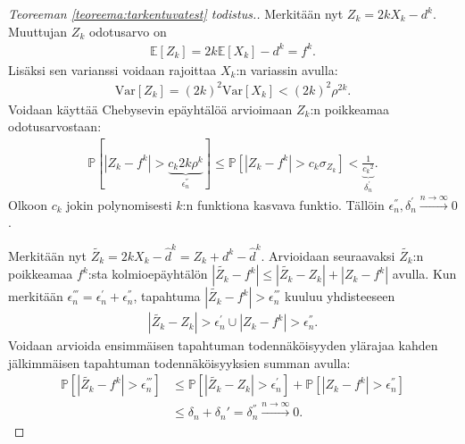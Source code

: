 \documentclass[finnish,12pt,a4paper,pdftex,sci,utf8]{aaltothesis}
\begin{document}
\begin{proof}[Teoreeman \ref{teoreema:tarkentuvatest} todistus.]
	Merkitään nyt $Z_k = 2k X_k - d^k$. Muuttujan $Z_k$ odotusarvo on 
	\begin{align*}
		\mathbb{E}[Z_k] = 2k \mathbb{E}[X_k] - d^k = f^k.
	\end{align*}
	Lisäksi sen varianssi voidaan rajoittaa $X_k$:n variassin avulla: 
	\begin{align*}
		\text{Var}[Z_k] = (2k)^2\text{Var}[X_k] < (2k)^2 \rho^{2k}.
	\end{align*}
	Voidaan käyttää Chebysevin epäyhtälöä arvioimaan $Z_k$:n poikkeamaa odotusarvostaan:
	\begin{align*}
		\mathbb{P}[|Z_k - f^k| > \underbrace{c_k 2k \rho^k}_{\epsilon_{n}^{''}}] \leq \mathbb{P}[|Z_k - f^k| > c_k \sigma_{Z_k}] < \underbrace{\frac{1}{{c_k}^2}}_{\delta_n^{'}}.
	\end{align*}
	Olkoon $c_k$ jokin polynomisesti $k$:n funktiona kasvava funktio. Tällöin $\epsilon_{n}^{''}, \delta_n^{'} \xrightarrow{ n \rightarrow \infty} 0$.

	Merkitään nyt $\tilde{Z_k} = 2kX_k - \hat{d}^k = Z_k + d^k - \hat{d}^k$. Arvioidaan seuraavaksi $\tilde{Z_k}$:n poikkeamaa $f^k$:sta kolmioepäyhtälön $|\tilde{Z_k} - f^k| \leq |\tilde{Z_k} - Z_k| + |Z_k - f^k|$ avulla. Kun merkitään $\epsilon_{n}^{'''} = \epsilon_{n}^{'} + \epsilon_{n}^{''}$, tapahtuma $|\tilde{Z_k} - f^k| > \epsilon_{n}^{'''}$ kuuluu yhdisteeseen 
	\begin{align*}
		|\tilde{Z_k} - Z_k| > \epsilon_{n}^{'} \cup |Z_k - f^k| > \epsilon_{n}^{''}.
	\end{align*}
	Voidaan arvioida ensimmäisen tapahtuman todennäköisyyden ylärajaa kahden jälkimmäisen tapahtuman todennäköisyyksien summan avulla:
	\begin{align*}
		\mathbb{P}[|\tilde{Z_k} - f^k| > \epsilon_{n}^{'''}] &\leq \mathbb{P}[|\tilde{Z_k} - Z_k| > \epsilon_{n}^{'}] + \mathbb{P}[|Z_k - f^k| > \epsilon_{n}^{''}] \\
		&\leq \delta_n + \delta_n' = \delta_n^{''} \xrightarrow{n \rightarrow \infty} 0.
	\end{align*}


\end{proof}
\end{document}
